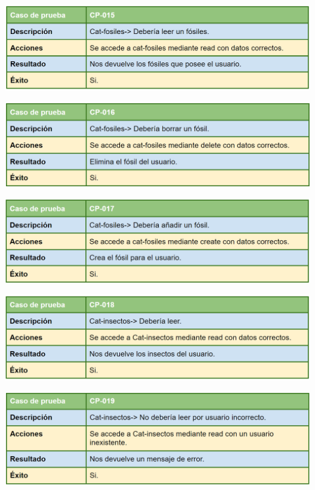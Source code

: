 \bigskip

\includegraphics[width=\textwidth]{img/cap7/cp-015.png}

\bigskip

\includegraphics[width=\textwidth]{img/cap7/cp-016.png}

\bigskip

\includegraphics[width=\textwidth]{img/cap7/cp-017.png}

\bigskip

\includegraphics[width=\textwidth]{img/cap7/cp-018.png}

\bigskip

\includegraphics[width=\textwidth]{img/cap7/cp-019.png}

